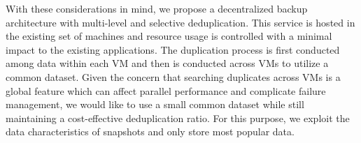 %


With these considerations in mind, we propose a decentralized backup architecture with multi-level and selective 
deduplication. This service is hosted   in the existing set of machines and resource usage is controlled
with a minimal impact to the existing applications.
The duplication process is first conducted among data within each VM
and then is conducted  across VMs to utilize a common dataset.  
Given the concern that searching duplicates across  VMs  is a global feature which can affect parallel performance
and complicate failure management,
we would like to use a small common dataset while still maintaining a cost-effective deduplication ratio.
For this purpose, we exploit the data characteristics of snapshots and only store most popular data.
%


